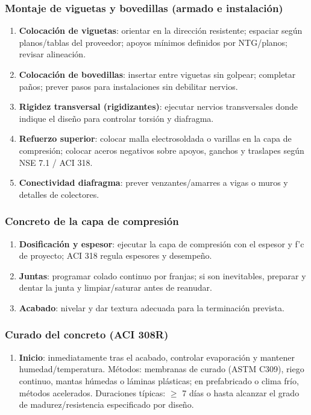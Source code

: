 \documentclass[12pt]{article}
\begin{document}
	\subsubsection{ Montaje de viguetas y bovedillas (armado e instalación)}
	\begin{enumerate}
		\item[6.] \textbf{Colocación de viguetas}: orientar en la dirección resistente; espaciar según planos/tablas del proveedor; apoyos mínimos definidos por NTG/planos; revisar alineación.
		\item[7.] \textbf{Colocación de bovedillas}: insertar entre viguetas sin golpear; completar paños; prever pasos para instalaciones sin debilitar nervios.
		\item[8.] \textbf{Rigidez transversal (rigidizantes)}: ejecutar nervios transversales donde indique el diseño para controlar torsión y diafragma.
		\item[9.] \textbf{Refuerzo superior}: colocar malla electrosoldada o varillas en la capa de compresión; colocar aceros negativos sobre apoyos, ganchos y traslapes según NSE 7.1 / ACI 318.
		\item[10.] \textbf{Conectividad diafragma}: prever venzantes/amarres a vigas o muros y detalles de colectores.
	\end{enumerate}
	
	\subsubsection{ Concreto de la capa de compresión}
	\begin{enumerate}
		\item[11.] \textbf{Dosificación y espesor}: ejecutar la capa de compresión con el espesor y f’c de proyecto; ACI 318 regula espesores y desempeño.
		\item[12.] \textbf{Juntas}: programar colado continuo por franjas; si son inevitables, preparar y dentar la junta y limpiar/saturar antes de reanudar.
		\item[13.] \textbf{Acabado}: nivelar y dar textura adecuada para la terminación prevista.
	\end{enumerate}
	
	\subsubsection{ Curado del concreto (ACI 308R)}
	\begin{enumerate}
		\item[14.] \textbf{Inicio}: inmediatamente tras el acabado, controlar evaporación y mantener humedad/temperatura. Métodos: membranas de curado (ASTM C309), riego continuo, mantas húmedas o láminas plásticas; en prefabricado o clima frío, métodos acelerados. Duraciones típicas: $\geq$ 7 días o hasta alcanzar el grado de madurez/resistencia especificado por diseño.
	\end{enumerate}
	
\end{document}
